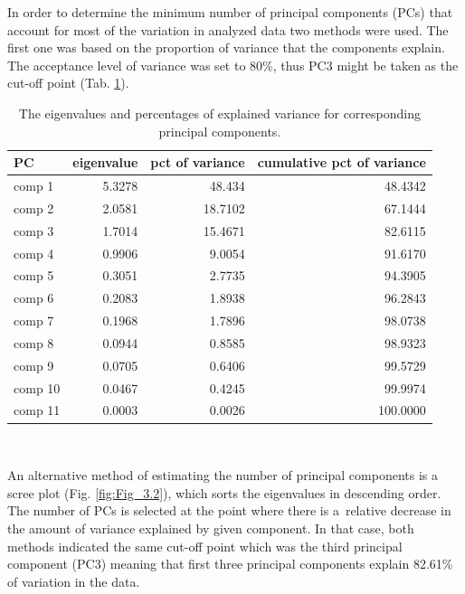 \documentclass[12pt,a4paper,notitlepage]{report}
\begin{document}
In order to determine the minimum number of principal components (PCs) that account for most of the variation in analyzed data two methods were used. The first one was based on the proportion of variance that the components explain. The acceptance level of variance was set to 80\%, thus PC3 might be taken as the cut-off point (Tab. \ref{tab:Eigenvalues}).

\begin{table}[H]
\centering
	\begin{tabular}{lrrr}
	\hline \textbf{PC}  & \textbf{eigenvalue}	& \textbf{pct of variance} & \textbf{cumulative pct of variance}  \\
	\hline
	\hline
	comp 1		&	5.3278		&	48.434			&	48.4342\\
	comp 2		&	2.0581		&	18.7102			&	67.1444\\
	comp 3		&	1.7014		&	15.4671			&	82.6115\\
	\hdashline
	comp 4		&	0.9906		&	9.0054			&	91.6170\\
	comp 5		&	0.3051		&	2.7735			&	94.3905\\
	comp 6		&	0.2083		&	1.8938			&	96.2843\\
	comp 7		&	0.1968		&	1.7896			&	98.0738\\
	comp 8		&	0.0944		&	0.8585			&	98.9323\\
	comp 9		&	0.0705		&	0.6406			&	99.5729\\
	comp 10		&	0.0467		&	0.4245			&	99.9974\\
	comp 11		&	0.0003		&	0.0026			&	100.0000\\
	\hline
	\end{tabular} \\ 
	\caption{The eigenvalues and percentages of explained variance for corresponding principal components.}
	\label{tab:Eigenvalues}
\end{table}

An alternative method of estimating the number of principal components is a scree plot (Fig. \ref{fig:Fig_3.2}), which sorts the eigenvalues in descending order. The number of PCs is selected at the point where there is \mbox{a relative} decrease in the amount of variance explained by given component. In that case, both methods indicated the same cut-off point which was the third principal component (PC3) meaning that first three principal components explain 82.61\% of variation in the data.
\end{document}
